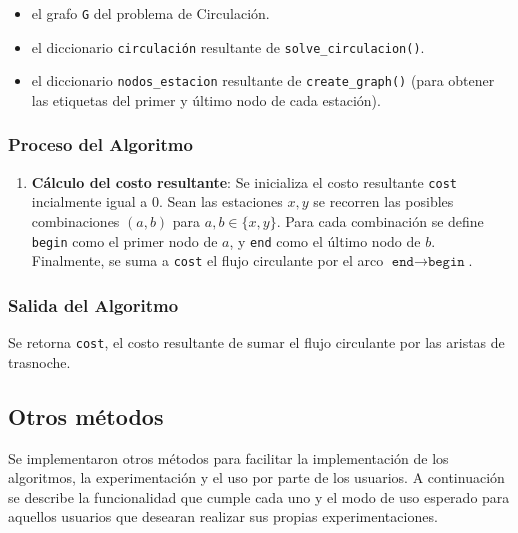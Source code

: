 \documentclass{article}
\begin{document}
\begin{itemize}
    \item el grafo \texttt{G} del problema de Circulación.
    \item el diccionario \texttt{circulación} resultante de \texttt{solve\_circulacion()}.
    \item el diccionario \texttt{nodos\_estacion} resultante de \texttt{create\_graph()} (para obtener las etiquetas del primer y último nodo de cada estación).
\end{itemize}

\subsubsection*{Proceso del Algoritmo}

\begin{enumerate}
    \item \textbf{Cálculo del costo resultante}:
    Se inicializa el costo resultante \texttt{cost} incialmente igual a 0.
    Sean las estaciones $x, y$ se recorren las posibles combinaciones $(a, b)$ para $a, b \in \{x, y\}$. Para cada combinación se define \texttt{begin} como el primer nodo de $a$, y  \texttt{end} como el último nodo de $b$. Finalmente, se suma a \texttt{cost} el flujo circulante por el arco $\texttt{end}\rightarrow\texttt{begin}$.

\end{enumerate}

\subsubsection*{Salida del Algoritmo}
Se retorna \texttt{cost}, el costo resultante de sumar el flujo circulante por las aristas de trasnoche.

\subsection*{Otros métodos}
Se implementaron otros métodos para facilitar la implementación de los algoritmos, la experimentación y el uso por parte de los usuarios. A continuación se describe la funcionalidad que cumple cada uno y el modo de uso esperado para aquellos usuarios que desearan realizar sus propias experimentaciones.
\end{document}
